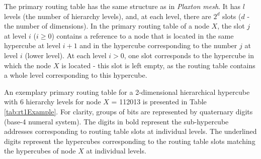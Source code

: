 The primary routing table has the same structure as in \emph{Plaxton mesh}. It has $l$ levels (the number of hierarchy levels), and, at each level, there are $2^d$ slots ($d$ - the number of dimensions). In the primary routing table of a node $X$, the slot $j$ at level $i$ ($i \geq 0$) contains a reference to a node that is located in the same hypercube at level $i+1$ and in the hypercube corresponding to the number $j$ at level $i$ (lower level). At each level $i>0$, one slot corresponds to the hypercube in which the node $X$ is located - this slot is left empty, as the routing table contains a whole level corresponding to this hypercube.

An exemplary primary routing table for a 2-dimensional hierarchical hypercube with 6 hierarchy levels for node $X$ = 112013 is presented in Table \ref{tab:rt1Example}. For clarity, groups of bits are represented by quaternary digits (base-4 numeral system). The digits in bold represent the sub-hypercube addresses corresponding to routing table slots at individual levels. The underlined digits represent the hypercubes corresponding to the routing table slots matching the hypercubes of node $X$ at individual levels.

